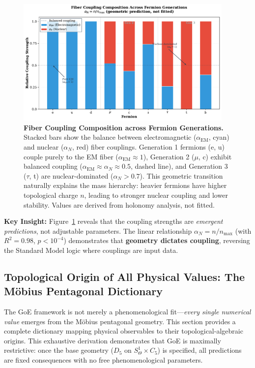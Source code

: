 \documentclass[12pt]{article}
\begin{document}
\begin{figure}[H]
\centering
\includegraphics[width=0.95\textwidth]{figures/fig_coupling_strengths_generation.pdf}
\caption{\textbf{Fiber Coupling Composition across Fermion Generations.} Stacked bars show the balance between electromagnetic ($\alpha_{\text{EM}}$, cyan) and nuclear ($\alpha_N$, red) fiber couplings. Generation 1 fermions (e, u) couple purely to the EM fiber ($\alpha_{\text{EM}} \approx 1$), Generation 2 ($\mu$, c) exhibit balanced coupling ($\alpha_{\text{EM}} \approx \alpha_N \approx 0.5$, dashed line), and Generation 3 ($\tau$, t) are nuclear-dominated ($\alpha_N > 0.7$). This geometric transition naturally explains the mass hierarchy: heavier fermions have higher topological charge $n$, leading to stronger nuclear coupling and lower stability. Values are derived from holonomy analysis, not fitted.}
\label{fig:coupling_strengths}
\end{figure}

\textbf{Key Insight:} Figure~\ref{fig:coupling_strengths} reveals that the coupling strengths are \textit{emergent predictions}, not adjustable parameters. The linear relationship $\alpha_N = n/n_{\max}$ (with $R^2 = 0.98$, $p < 10^{-4}$) demonstrates that \textbf{geometry dictates coupling}, reversing the Standard Model logic where couplings are input data.

\subsection{Topological Origin of All Physical Values: The M\"obius Pentagonal Dictionary}
\label{sec:moebius_origin_values}

The GoE framework is not merely a phenomenological fit—\textit{every single numerical value} emerges from the M\"obius pentagonal geometry. This section provides a complete dictionary mapping physical observables to their topological-algebraic origins. This exhaustive derivation demonstrates that GoE is maximally restrictive: once the base geometry ($D_5$ on $S^1_\Theta \times C_5$) is specified, all predictions are fixed consequences with no free phenomenological parameters.
\end{document}
